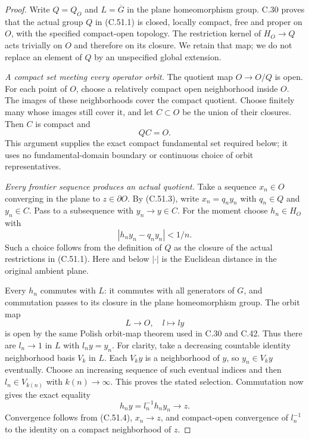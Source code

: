\begin{proof}
Write $Q=Q_O$ and $L=\overline G$ in the plane
homeomorphism group. C.30 proves that the actual group
$Q$ in (C.51.1) is closed, locally compact, free and
proper on $O$, with the specified compact-open topology.
The restriction kernel of $H_O\to Q$ acts trivially
on $O$ and therefore on its closure.
We retain that map; we do not replace an element of
$Q$ by an unspecified global extension.

\emph{A compact set meeting every operator orbit.}
The quotient map $O\to O/Q$ is open. For each point
of $O$, choose a relatively compact open neighborhood
inside $O$. The images of these neighborhoods cover
the compact quotient. Choose finitely many whose
images still cover it, and let $C\subset O$ be the
union of their closures. Then $C$ is compact and
\[
                              Q C=O.                   \tag{C.51.3}
\]
This argument supplies the exact compact fundamental
set required below; it uses no fundamental-domain
boundary or continuous choice of orbit representatives.

\emph{Every frontier sequence produces an actual quotient.}
Take a sequence $x_n\in O$ converging in the plane to
$z\in\partial O$. By (C.51.3), write
$x_n=q_ny_n$ with $q_n\in Q$ and $y_n\in C$.
Pass to a subsequence with $y_n\to y\in C$.
For the moment choose $h_n\in H_O$ with
\[
                    |h_ny_n-q_ny_n|<1/n.               \tag{C.51.4}
\]
Such a choice follows from the definition of $Q$ as
the closure of the actual restrictions in (C.51.1).
Here and below $|\cdot|$ is the Euclidean distance
in the original ambient plane.

Every $h_n$ commutes with $L$: it commutes with all
generators of $G$, and commutation passes to its
closure in the plane homeomorphism group.
The orbit map
\[
                      L\longrightarrow O,\quad l\mapsto ly
                                                        \tag{C.51.5}
\]
is open by the same Polish orbit-map theorem used in
C.30 and C.42. Thus there are $l_n\to1$ in $L$ with
$l_ny=y_n$.
For clarity, take a decreasing countable identity
neighborhood basis $V_k$ in $L$. Each $V_k y$ is a
neighborhood of $y$, so $y_n\in V_k y$ eventually.
Choose an increasing sequence of such eventual
indices and then $l_n\in V_{k(n)}$ with
$k(n)\to\infty$. This proves the stated selection.
Commutation now gives the exact equality
\[
                       h_ny=l_n^{-1}h_ny_n\longrightarrow z.
                                                        \tag{C.51.6}
\]
Convergence follows from (C.51.4), $x_n\to z$, and
compact-open convergence of $l_n^{-1}$ to the identity
on a compact neighborhood of $z$.


\end{proof}
